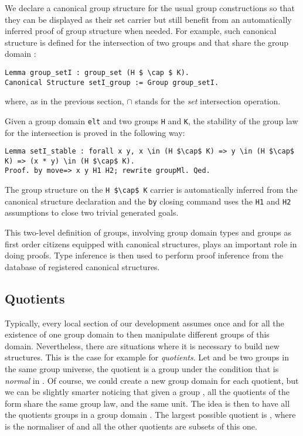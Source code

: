 We declare a canonical group structure for the
usual group constructions so that they can
be displayed as their set carrier but still benefit from an automatically
inferred proof of group structure when needed.
For example, such canonical structure is defined for the intersection of two
groups  and  that share the group domain :
\begin{lstlisting}
Lemma group_setI : group_set (H $ \cap $ K).
Canonical Structure setI_group := Group group_setI.
\end{lstlisting}
\noindent where, as in the previous section, $\cap$ stands for the
\emph{set} intersection operation.

\noindent Given a group domain \lstinline[basicstyle=\footnotesize]+elt+ and two groups \lstinline[basicstyle=\footnotesize]+H+ and
\lstinline[basicstyle=\footnotesize]+K+, the stability of the group law for the intersection is proved in
the following way:
\begin{lstlisting}
Lemma setI_stable : forall x y, x \in (H $\cap$ K) => y \in (H $\cap$ K) => (x * y) \in (H $\cap$ K).
Proof. by move=> x y H1 H2; rewrite groupMl. Qed.
\end{lstlisting}
The group structure on the \lstinline[basicstyle=\footnotesize]+H $\cap$ K+ carrier is
automatically inferred from the
canonical structure declaration and the \lstinline[basicstyle=\footnotesize]+by+
closing command uses the \lstinline[basicstyle=\footnotesize]+H1+ and \lstinline[basicstyle=\footnotesize]+H2+
assumptions to close two trivial generated goals.

This two-level definition of groups, involving group
domain types and groups as first order citizens equipped with
canonical structures, plays an important
role in doing proofs. Type inference is then used to
perform proof inference from the database of registered canonical structures.

\subsection{Quotients}

Typically, every local section of our development assumes once and
for all the existence of one group domain  to then manipulate 
different groups of this domain.
Nevertheless, there are situations where it is necessary to build 
new  structures. This is the case for example for
\emph{quotients}.
Let  and  be two groups in the same group universe,
the quotient  is a group under the condition that
 is \emph{normal} in .
Of course, we could create a new group domain for each quotient, but we
can be slightly smarter noticing that given a group , all the 
quotients of the form  share the same  group law, and the same unit.
The idea is then to have all the quotients groups  in a group domain .
The largest possible quotient is , where  is the normaliser of  and
all the other quotients are subsets of this one.


